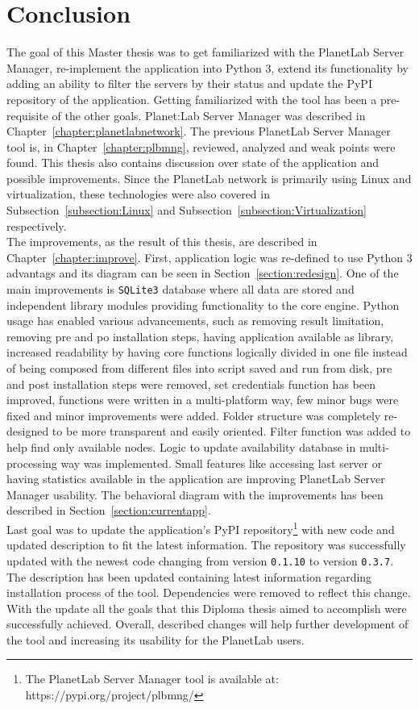 \chapter{Conclusion}
The goal of this Master thesis was to get familiarized with the PlanetLab Server Manager, re-implement the application into Python 3, extend its functionality by adding an ability to filter the servers by their status and update the PyPI repository of the application. Getting familiarized with the tool has been a pre-requisite of the other goals. Planet:Lab Server Manager was described in Chapter~\ref{chapter:planetlabnetwork}. The previous PlanetLab Server Manager tool is, in Chapter~\ref{chapter:plbmng}, reviewed, analyzed and weak points were found. This thesis also contains discussion over state of the application and possible improvements. Since the PlanetLab network is primarily using Linux and virtualization, these technologies were also covered in Subsection~\ref{subsection:Linux} and Subsection~\ref{subsection:Virtualization} respectively.\\
The improvements, as the result of this thesis, are described in Chapter~\ref{chapter:improve}. First, application logic was re-defined to use Python 3 advantags and its diagram can be seen in Section~\ref{section:redesign}. One of the main improvements is \texttt{SQLite3} database where all data are stored and independent library modules providing functionality to the core engine. Python usage has enabled various advancements, such as removing result limitation, removing pre and po installation steps, having application available as library, increased readability by having core functions logically divided in one file instead of being composed from different files into script saved and run from disk, pre and post installation steps were removed, set credentials function has been improved, functions were written in a multi-platform way, few minor bugs were fixed and minor improvements were added. Folder structure was completely re-designed to be more transparent and easily oriented. Filter function was added to help find only available nodes. Logic to update availability database in multi-processing way was implemented. Small features like accessing last server or having statistics available in the application are improving PlanetLab Server Manager usability. The behavioral diagram with the improvements has been described in Section~\ref{section:currentapp}.\\
Last goal was to update the application's PyPI repository\footnote{The PlanetLab Server Manager tool is available at: https://pypi.org/project/plbmng/} with new code and updated description to fit the latest information. The repository was successfully updated with the newest code changing from version \texttt{0.1.10} to version \texttt{0.3.7}. The description has been updated containing latest information regarding installation process of the tool. Dependencies were removed to reflect this change. With the update all the goals that this Diploma thesis aimed to accomplish were successfully achieved. Overall, described changes will help further development of the tool and increasing its usability for the PlanetLab users.